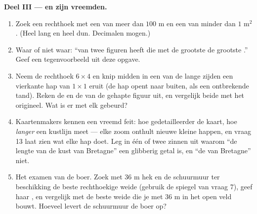 \begin{problem}
\medskip
\noindent\textbf{Deel III ---  en  zijn vreemden.}
\begin{enumerate}[resume]
  \item Zoek een rechthoek met een  van meer dan $100$ m en een
         van minder dan $1$ m$^2$. (Heel lang en heel dun. Decimalen
        mogen.)
  \item Waar of niet waar: ``van twee figuren heeft die met de grootste  de
        grootste .'' Geef een tegenvoorbeeld uit deze opgave.
  \item Neem de rechthoek $6 \times 4$ en knip midden in een van de lange zijden
        een vierkante hap van $1 \times 1$ eruit (de hap opent naar buiten, als
        een ontbrekende tand). Reken de  en de  van de gehapte
        figuur uit, en vergelijk beide met het origineel. Wat is er met elk
        gebeurd?
  \item Kaartenmakers kennen een vreemd feit: hoe gedetailleerder de kaart, hoe
        \emph{langer} een kustlijn meet --- elke zoom onthult nieuwe kleine
        happen, en vraag 13 laat zien wat elke hap doet. Leg in één of twee
        zinnen uit waarom ``de lengte van de kust van Bretagne'' een glibberig
        getal is, en ``de  van Bretagne'' niet.
  \item Het examen van de boer. Zoek met $36$ m hek en de schuurmuur ter
        beschikking de beste rechthoekige weide (gebruik de spiegel van vraag 7),
        geef haar , en vergelijk met de beste weide die je met $36$ m
        in het open veld bouwt. Hoeveel levert de schuurmuur de boer op?
\end{enumerate}
\end{problem}
